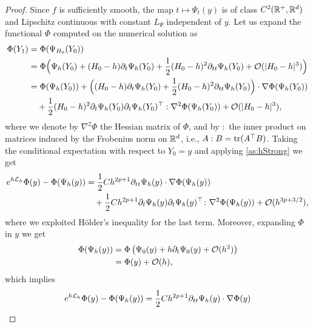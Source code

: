 \documentclass[10pt]{article}
\begin{document}
\begin{proof} Since $f$ is sufficiently smooth, the map $t \mapsto \Psi_t(y)$ is of class $C^2(\mathbb{R}^+, \mathbb{R}^d)$ and Lipschitz continuous with constant $L_\Psi$ independent of $y$. Let us expand the functional $\Phi$ computed on the numerical solution as
	\begin{equation}\label{eq:TaylorNumericalSolution}
		\begin{aligned}
			\Phi(Y_1) &= \Phi(\Psi_{H_0}(Y_0)) \\
			&= \Phi\Big(\Psi_h(Y_0) + (H_0-h)\partial_t\Psi_h(Y_0) + \frac{1}{2}(H_0-h)^2\partial_{tt}\Psi_h(Y_0) + \mathcal{O}(\lvert H_0 - h\rvert^3)\Big)\\
			&= \Phi(\Psi_h(Y_0)) + \Big((H_0 - h)\partial_t\Psi_h(Y_0)+\frac{1}{2}(H_0-h)^2\partial_{tt}\Psi_h(Y_0)\Big) \cdot \nabla\Phi(\Psi_h(Y_0))\\
			&\quad + \frac{1}{2}(H_0 - h)^2 \partial_t \Psi_h(Y_0) \partial_t \Psi_h(Y_0)^\top : \nabla^2\Phi(\Psi_h(Y_0)) + \mathcal{O}(\lvert H_0 - h\rvert^3),
		\end{aligned}
	\end{equation}
	where we denote by $\nabla^2\Phi$ the Hessian matrix of $\Phi$, and by $:$ the inner product on matrices induced by the Frobenius norm on $\mathbb{R}^d$, i.e., $A : B = \operatorname{tr}(A^\top B)$. Taking the conditional expectation with respect to $Y_0 = y$ and applying \cref{as:hStrong} we get
	\begin{equation}\label{eq:TaylorNumericalSolution2}
		\begin{aligned}
			e^{h\mathcal{L}_h}\Phi(y) - \Phi(\Psi_h(y)) &= \frac{1}{2} Ch^{2p+1}\partial_{tt}\Psi_h(y)\cdot \nabla\Phi(\Psi_h(y))\\
			&\quad + \frac{1}{2} Ch^{2p+1}\partial_t \Psi_h(y) \partial_t \Psi_h(y)^\top  \colon \nabla^2\Phi(\Psi_h(y)) + \mathcal{O}(h^{3p+3/2}),
		\end{aligned}
	\end{equation}
	where we exploited Hölder's inequality for the last term. Moreover, expanding $\Phi$ in $y$ we get
	\begin{equation}
		\begin{aligned}
			\Phi(\Psi_h(y)) &= \Phi\left(\Psi_0(y) + h\partial_t \Psi_0(y) + \mathcal{O}(h^2)\right) \\
			&= \Phi(y) + \mathcal{O}(h),
		\end{aligned}
	\end{equation}
	which implies
	\begin{equation}\label{eq:DistanceProbDet}
		\begin{aligned}
			e^{h\diffL_h}\Phi(y) - \Phi(\Psi_h(y)) &= \frac{1}{2} Ch^{2p+1}\partial_{tt}\Psi_h(y) \cdot \nabla\Phi(y)\\

\end{aligned}
\end{equation}
\end{proof}
\end{document}
